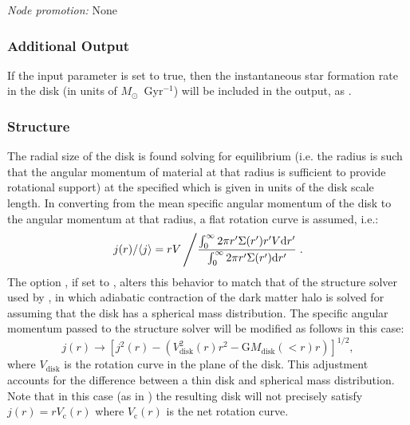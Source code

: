 \noindent\emph{Node promotion:} None\\

\subsubsection{Additional Output}

If the \mono{[diskOutputStarFormationRate]} input parameter is set to true, then the instantaneous star formation rate in the disk (in units of $M_\odot$~Gyr$^{-1}$) will be included in the output, as .

\subsubsection{Structure}

The radial size of the disk is found solving for equilibrium (i.e. the radius is such that the angular momentum of material at that radius is sufficient to provide rotational support) at the specified \mono{[diskStructureSolverRadius]} which is given in units of the disk scale length. In converting from the mean specific angular momentum of the disk to the angular momentum at that radius, a flat rotation curve is assumed, i.e.:
\begin{equation}
 j(r)/\langle j \rangle = r V \left/ {\int_0^\infty 2 \pi r^\prime \Sigma(r^\prime) r^\prime V \mathrm{d} r^\prime \over \int_0^\infty 2 \pi r^\prime \Sigma(r^\prime) \mathrm{d} r^\prime} \right. .
\end{equation}
The option , if set to , alters this behavior to match that of the structure solver used by \cite{cole_hierarchical_2000}, in which adiabatic contraction of the dark matter halo is solved for assuming that the disk has a spherical mass distribution. The specific angular momentum passed to the structure solver will be modified as follows in this case:
\begin{equation}
 j(r) \rightarrow \left[ j^2(r) - \left( V_\mathrm{disk}^2(r) r^2 - \mathrm{G} M_\mathrm{disk}(<r) r \right) \right]^{1/2},
\end{equation}
where $V_\mathrm{disk}$ is the rotation curve in the plane of the disk. This adjustment accounts for the difference between a thin disk and spherical mass distribution. Note that in this case (as in \citealt{cole_hierarchical_2000}) the resulting disk will not precisely satisfy $j(r) = r V_\mathrm{c}(r)$ where $V_\mathrm{c}(r)$ is the net rotation curve.

